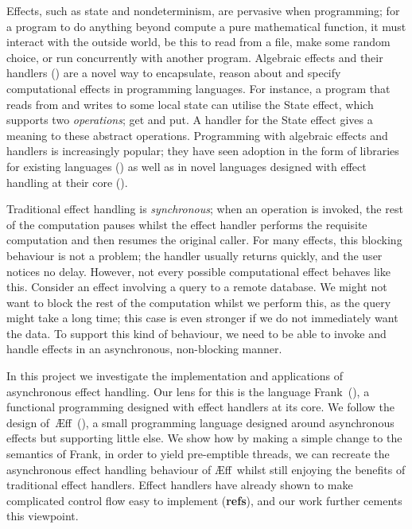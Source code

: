 \documentclass[msc,deptreport,cs]{infthesis} %
\newcommand\aeff{{\AE}ff\xspace}
\begin{document}
Effects, such as state and nondeterminism, are pervasive when programming; for a
program to do anything beyond compute a pure mathematical function, it must
interact with the outside world, be this to read from a file, make some random
choice, or run concurrently with another program. Algebraic effects and their
handlers (\cite{plotkin2013handling}) are a novel way to encapsulate, reason
about and specify computational effects in programming languages. For instance,
a program that reads from and writes to some local state can utilise the
\textsf{State} effect, which supports two \emph{operations}; \textsf{get} and
\textsf{put}. A handler for the \textsf{State} effect gives a meaning to these
abstract operations. Programming with algebraic effects and handlers is
increasingly popular; they have seen adoption in the form of libraries for
existing languages (\cite{kammar2013handlers, kiselyov2013extensible,
  brady2013programming}) as well as in novel languages designed with effect
handling at their core (\cite{bauer2015programming, leijen2017type, convent2020doo}).

Traditional effect handling is \emph{synchronous}; when an operation is invoked,
the rest of the computation pauses whilst the effect handler performs the
requisite computation and then resumes the original caller.
%
For many effects, this blocking behaviour is not a problem; the handler usually
returns quickly, and the user notices no delay. However, not every possible
computational effect behaves like this. Consider an effect involving a query to
a remote database. We might not want to block the rest of the computation whilst
we perform this, as the query might take a long time; this case is even stronger
if we do not immediately want the data. To support this kind of behaviour, we
need to be able to invoke and handle effects in an asynchronous, non-blocking
manner.

In this project we investigate the implementation and applications of
asynchronous effect handling. Our lens for this is the language
Frank~(\cite{lindley2017do, convent2020doo}), a functional programming designed
with effect handlers at its core. We follow the design
of~\aeff~(\cite{ahman2020asynchronous}), a small programming language designed
around asynchronous effects but supporting little else.
%
We show how by making a simple change to the semantics of Frank, in order to
yield pre-emptible threads, we can recreate the asynchronous effect handling
behaviour of \aeff~whilst still enjoying the benefits of traditional effect
handlers.
%
Effect handlers have already shown to make complicated control flow easy to
implement (\textbf{refs}), and our work further cements this viewpoint.
\end{document}
